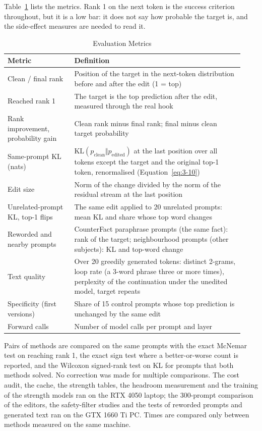 \documentclass[12pt,a4paper]{report}
\begin{document}
Table~\ref{tab:metrics} lists the metrics. Rank 1 on the next token is the success criterion throughout, but it is a low bar: it does not say how probable the target is, and the side-effect measures are needed to read it.

\begin{table}[H]
\centering
\caption{Evaluation Metrics}\label{tab:metrics}
{\small\renewcommand{\arraystretch}{1.15}
\begin{tabular}{|>{\raggedright\arraybackslash}p{0.260\linewidth}|>{\raggedright\arraybackslash}p{0.668\linewidth}|}
\hline
\textbf{Metric} & \textbf{Definition} \\ \hline
Clean / final rank & Position of the target in the next-token distribution before and after the edit (1 = top) \\ \hline
Reached rank 1 & The target is the top prediction after the edit, measured through the real hook \\ \hline
Rank improvement, probability gain & Clean rank minus final rank; final minus clean target probability \\ \hline
Same-prompt KL (nats) & $\mathrm{KL}(p_{\text{clean}} \Vert p_{\text{edited}})$ at the last position over all tokens except the target and the original top-1 token, renormalised (Equation~\ref{eq:3-10}) \\ \hline
Edit size & Norm of the change divided by the norm of the residual stream at the last position \\ \hline
Unrelated-prompt KL, top-1 flips & The same edit applied to 20 unrelated prompts: mean KL and share whose top word changes \\ \hline
Reworded and nearby prompts & CounterFact paraphrase prompts (the same fact): rank of the target; neighbourhood prompts (other subjects): KL and top-word change \\ \hline
Text quality & Over 20 greedily generated tokens: distinct 2-grams, loop rate (a 3-word phrase three or more times), perplexity of the continuation under the unedited model, target repeats \\ \hline
Specificity (first versions) & Share of 15 control prompts whose top prediction is unchanged by the same edit \\ \hline
Forward calls & Number of model calls per prompt and layer \\ \hline
\end{tabular}}
\end{table}

Pairs of methods are compared on the same prompts with the exact McNemar test \cite{r39} on reaching rank 1, the exact sign test where a better-or-worse count is reported, and the Wilcoxon signed-rank test \cite{r40} on KL for prompts that both methods solved. No correction was made for multiple comparisons. The cost audit, the cache, the strength tables, the headroom measurement and the training of the strength models ran on the RTX 4050 laptop; the 300-prompt comparison of the editors, the safety-filter studies and the tests of reworded prompts and generated text ran on the GTX 1660 Ti PC. Times are compared only between methods measured on the same machine.
\end{document}
